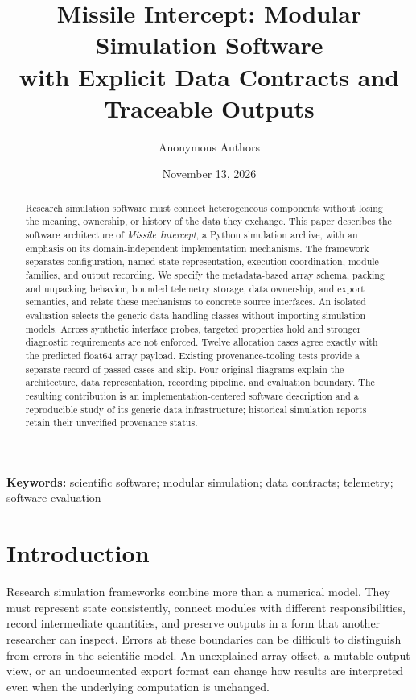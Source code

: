 \documentclass[11pt,a4paper]{article}
\title{\vspace{-1em}\textbf{Missile Intercept: Modular Simulation Software\\with Explicit Data Contracts and Traceable Outputs}}
\author{Anonymous Authors}
\date{November 13, 2026}
\begin{document}
\maketitle
\thispagestyle{plain}
\begin{abstract}
Research simulation software must connect heterogeneous components without losing the meaning, ownership, or history of the data they exchange. This paper describes the software architecture of \emph{Missile Intercept}, a Python simulation archive, with an emphasis on its domain-independent implementation mechanisms. The framework separates configuration, named state representation, execution coordination, module families, and output recording. We specify the metadata-based array schema, packing and unpacking behavior, bounded telemetry storage, data ownership, and export semantics, and relate these mechanisms to concrete source interfaces. An isolated evaluation selects the generic data-handling classes without importing simulation models. Across \SoftwareProbeCount synthetic interface probes, \SoftwareRequirementsMet targeted properties hold and \SoftwareLimitations stronger diagnostic requirements are not enforced. Twelve allocation cases agree exactly with the predicted float64 array payload. Existing provenance-tooling tests provide a separate record of \TestsPassed passed cases and \TestsSkipped skip. Four original diagrams explain the architecture, data representation, recording pipeline, and evaluation boundary. The resulting contribution is an implementation-centered software description and a reproducible study of its generic data infrastructure; historical simulation reports retain their unverified provenance status.
\end{abstract}
\noindent\textbf{Keywords:} scientific software; modular simulation; data contracts; telemetry; software evaluation

\section{Introduction}
Research simulation frameworks combine more than a numerical model. They must represent state consistently, connect modules with different responsibilities, record intermediate quantities, and preserve outputs in a form that another researcher can inspect. Errors at these boundaries can be difficult to distinguish from errors in the scientific model. An unexplained array offset, a mutable output view, or an undocumented export format can change how results are interpreted even when the underlying computation is unchanged.
\end{document}
